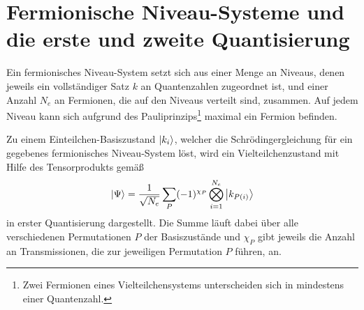 \section{Fermionische Niveau-Systeme und die erste und zweite Quantisierung}

Ein fermionisches Niveau-System setzt sich aus einer Menge an Niveaus, denen jeweils ein vollständiger Satz $k$ an Quantenzahlen zugeordnet ist, und einer Anzahl $N_e$ an Fermionen, die auf den Niveaus verteilt sind, zusammen.
Auf jedem Niveau kann sich aufgrund des Pauliprinzips\footnote{Zwei Fermionen eines Vielteilchensystems unterscheiden sich in mindestens einer Quantenzahl.} maximal ein Fermion befinden.

Zu einem Einteilchen-Basiszustand $\ket{k_i}$, welcher die Schrödingergleichung für ein gegebenes fermionisches Niveau-System löst,
wird ein Vielteilchenzustand mit Hilfe des Tensorprodukts gemäß
\begin{align}
  \ket{\Psi} = \frac{1}{\sqrt{N_e}} \sum_{P} (-1)^{\chi_P} \bigotimes\limits_{i=1}^{N_e} \ket{k_{P(i)}}
  \label{eqn:vtdarstellung1quant}
\end{align}
in erster Quantisierung dargestellt. Die Summe läuft dabei über alle verschiedenen Permutationen $P$ der Basiszustände und $\chi_P$ gibt jeweils die Anzahl an Transmissionen, die zur jeweiligen Permutation $P$ führen, an.

